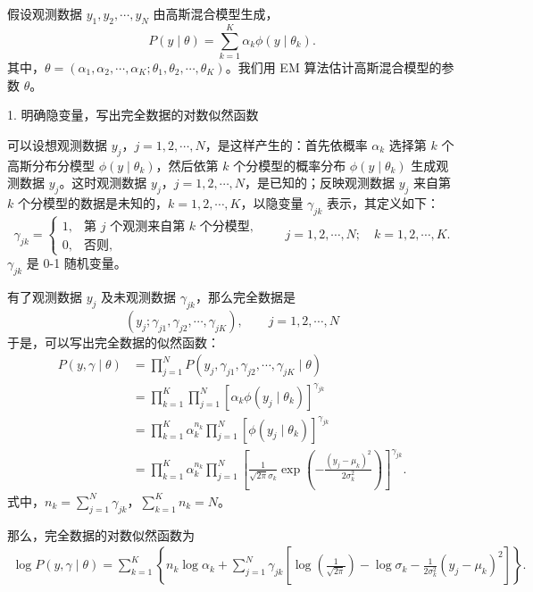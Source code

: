 \documentclass[UTF8, 12pt, fontset=fandol, oneside]{ctexart}
\begin{document}
假设观测数据 $y_1,y_2,\cdots,y_N$ 由高斯混合模型生成，
\begin{equation}
  P(y\mid\theta)=\sum_{k=1}^K \alpha_k\phi(y\mid\theta_k).
  \tag{9.26}
\end{equation}
其中，$\theta=(\alpha_1,\alpha_2,\cdots,\alpha_K;\theta_1,\theta_2,\cdots,\theta_K)$。我们用 EM 算法估计高斯混合模型的参数 $\theta$。

1. 明确隐变量，写出完全数据的对数似然函数

可以设想观测数据 $y_j$，$j=1,2,\cdots,N$，是这样产生的：首先依概率 $\alpha_k$ 选择第 $k$ 个高斯分布分模型 $\phi(y\mid\theta_k)$，然后依第 $k$ 个分模型的概率分布 $\phi(y\mid\theta_k)$ 生成观测数据 $y_j$。这时观测数据 $y_j$，$j=1,2,\cdots,N$，是已知的；反映观测数据 $y_j$ 来自第 $k$ 个分模型的数据是未知的，$k=1,2,\cdots,K$，以隐变量 $\gamma_{jk}$ 表示，其定义如下：
\begin{equation}
  \gamma_{jk}=
  \begin{cases}
    1, & \text{第 $j$ 个观测来自第 $k$ 个分模型},\\
    0, & \text{否则},
  \end{cases}
  \qquad
  j=1,2,\cdots,N;\quad k=1,2,\cdots,K.
  \tag{9.27}
\end{equation}
$\gamma_{jk}$ 是 0-1 随机变量。

有了观测数据 $y_j$ 及未观测数据 $\gamma_{jk}$，那么完全数据是
\[
  (y_j;\gamma_{j1},\gamma_{j2},\cdots,\gamma_{jK}),\qquad j=1,2,\cdots,N
\]
于是，可以写出完全数据的似然函数：
\[
\begin{aligned}
  P(y,\gamma\mid\theta)
  &=\prod_{j=1}^N P(y_j,\gamma_{j1},\gamma_{j2},\cdots,\gamma_{jK}\mid\theta)\\
  &=\prod_{k=1}^K\prod_{j=1}^N
  [\alpha_k\phi(y_j\mid\theta_k)]^{\gamma_{jk}}\\
  &=\prod_{k=1}^K\alpha_k^{n_k}\prod_{j=1}^N
  [\phi(y_j\mid\theta_k)]^{\gamma_{jk}}\\
  &=\prod_{k=1}^K\alpha_k^{n_k}\prod_{j=1}^N
  \left[\frac1{\sqrt{2\pi}\sigma_k}
  \exp\left(-\frac{(y_j-\mu_k)^2}{2\sigma_k^2}\right)\right]^{\gamma_{jk}}.
\end{aligned}
\]
式中，$n_k=\sum_{j=1}^N\gamma_{jk}$，$\sum_{k=1}^K n_k=N$。

那么，完全数据的对数似然函数为
\[
\begin{aligned}
  \log P(y,\gamma\mid\theta)
  =\sum_{k=1}^K\left\{
  n_k\log\alpha_k+\sum_{j=1}^N\gamma_{jk}
  \left[\log\left(\frac1{\sqrt{2\pi}}\right)-\log\sigma_k
  -\frac1{2\sigma_k^2}(y_j-\mu_k)^2\right]\right\}.
\end{aligned}
\]
\end{document}
